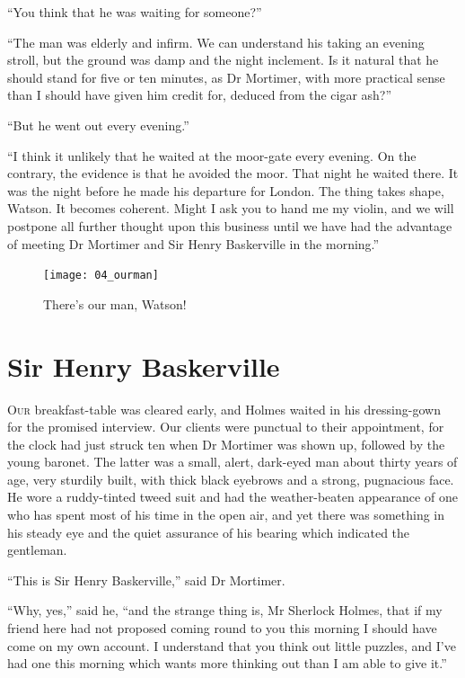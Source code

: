 \documentclass[paper=5.5in:8.5in,BCOR=7mm,twoside,DIV=calc,12pt,usegeometry,openany,chapterprefix,endperiod,headings=big]{scrbook} %
\begin{document}
\enquote{You think that he was waiting for someone?}

\enquote{The man was elderly and infirm. We can understand his taking an evening stroll, but the ground was damp and the night inclement. Is it natural that he should stand for five or ten minutes, as Dr Mortimer, with more practical sense than I should have given him credit for, deduced from the cigar ash?}

\enquote{But he went out every evening.}

\enquote{I think it unlikely that he waited at the moor-gate every evening. On the contrary, the evidence is that he avoided the moor. That night he waited there. It was the night before he made his departure for London. The thing takes shape, Watson. It becomes coherent. Might I ask you to hand me my violin, and we will postpone all further thought upon this business until we have had the advantage of meeting Dr Mortimer and Sir Henry Baskerville in the morning.}
\clearpage
\vfill
\begin{figure}[ph!]
\centering
\texttt{[image: 04\_ourman]}
\caption{There's our man, Watson!}
\end{figure}
\vfill
\thispagestyle{empty}
\clearpage

\chapter{Sir Henry Baskerville}
\lettrine[lines=1]{O}{ur} breakfast-table was cleared early, and Holmes waited in his dressing-gown for the promised interview. Our clients were punctual to their appointment, for the clock had just struck ten when Dr Mortimer was shown up, followed by the young baronet. The latter was a small, alert, dark-eyed man about thirty years of age, very sturdily built, with thick black eyebrows and a strong, pugnacious face. He wore a ruddy-tinted tweed suit and had the weather-beaten appearance of one who has spent most of his time in the open air, and yet there was something in his steady eye and the quiet assurance of his bearing which indicated the gentleman.

\enquote{This is Sir Henry Baskerville,} said Dr Mortimer.


\enquote{Why, yes,} said he, \enquote{and the strange thing is, Mr Sherlock Holmes, that if my friend here had not proposed coming round to you this morning I should have come on my own account. I understand that you think out little puzzles, and I've had one this morning which wants more thinking out than I am able to give it.}
\end{document}
